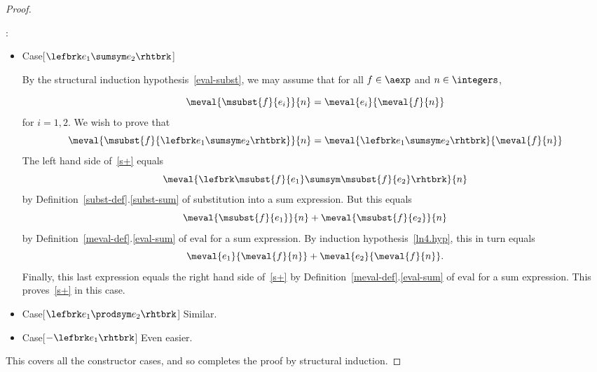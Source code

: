 \begin{definition}
\begin{proof}
\begin{itemize}
\end{itemize}

:
\begin{itemize}

\item Case[$\lefbrk e_1 \sumsym e_2 \rhtbrk$]

  By the structural induction hypothesis~\eqref{eval-subst}, we may assume
  that for all $f \in \aexp$ and $n \in \integers$,

\begin{equation}\label{ln4.hyp}
\meval{\msubst{f}{e_i}}{n}  =  \meval{e_i}{\meval{f}{n}}
\end{equation}
for $i= 1,2$.  We wish to prove that
\begin{equation}\label{s+}
\meval{\msubst{f}{\lefbrk e_1\sumsym e_2 \rhtbrk}}{n}  =  \meval{\lefbrk e_1 \sumsym e_2 \rhtbrk}{ \meval{f}{n}}
\end{equation}
The left hand side of~\eqref{s+} equals
\[
\meval{\lefbrk \msubst{f}{e_1} \sumsym \msubst{f}{e_2} \rhtbrk}{ n}
\]
by Definition~\ref{subst-def}.\ref{subst-sum} of substitution into a sum
expression.  But this equals
\[
\meval{\msubst{f}{e_1}}{n} + \meval{\msubst{f}{e_2}}{n}
\]
by Definition~\ref{meval-def}.\eqref{eval-sum} of $\text{eval}$ for a sum expression.  By
induction hypothesis~\eqref{ln4.hyp}, this in turn equals
\[
\meval{e_1}{\meval{f}{n}} + \meval{e_2}{\meval{f}{n}}.
\]
Finally, this last expression equals the right hand side of~\eqref{s+} by
Definition~\ref{meval-def}.\eqref{eval-sum} of $\text{eval}$ for a sum
expression.  This proves~\eqref{s+} in this case.

\item Case[$\lefbrk e_1 \prodsym e_2 \rhtbrk$]  Similar.

\item Case[$-\lefbrk e_1 \rhtbrk$]  Even easier.

\end{itemize}

This covers all the constructor cases, and so completes the proof by
structural induction.

\end{proof}

\begin{problems}
\practiceproblems
{}

\homeworkproblems
{}
\end{problems}

\begin{editingnotes}


\end{editingnotes}
\end{definition}
